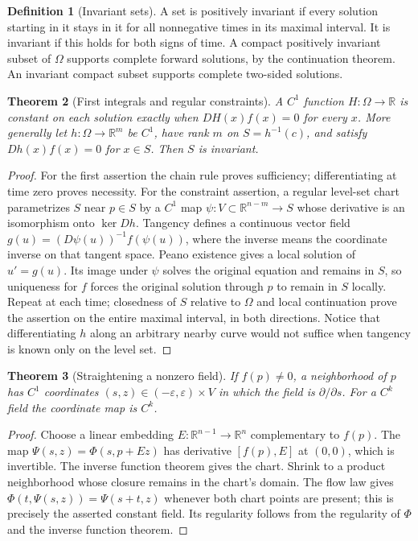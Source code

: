 \documentclass[11pt,oneside]{book}
\newtheorem{theorem}{Theorem}[chapter]
\theoremstyle{definition}
\newtheorem{definition}[theorem]{Definition}
\theoremstyle{remark}\newtheorem{remark}[theorem]{Remark}
\newcommand{\R}{\mathbb R}\newcommand{\C}{\mathbb C}
\begin{document}
\begin{definition}[Invariant sets]\label{d13:11:invariant}
A set is positively invariant if every solution starting in it stays in
it for all nonnegative times in its maximal interval. It is invariant
if this holds for both signs of time. A compact positively invariant
subset of \(\Omega\) supports complete forward solutions, by the
continuation theorem. An invariant compact subset supports complete
two-sided solutions.
\end{definition}

\begin{theorem}[First integrals and regular constraints]\label{d13:11:first-integral}
A \(C^1\) function \(H:\Omega\to\R\) is constant on each solution exactly
when \(DH(x)f(x)=0\) for every \(x\).
More generally let \(h:\Omega\to\R^m\) be \(C^1\), have rank \(m\)
on \(S=h^{-1}(c)\), and satisfy \(Dh(x)f(x)=0\) for \(x\in S\).
Then \(S\) is invariant.
\end{theorem}
\begin{proof}
For the first assertion the chain rule proves sufficiency; differentiating
at time zero proves necessity. For the constraint assertion, a regular
level-set chart parametrizes \(S\) near \(p\in S\) by a \(C^1\) map
\(\psi:V\subset\R^{n-m}\to S\) whose derivative is an isomorphism onto
\(\ker Dh\). Tangency defines a continuous vector field
\(g(u)=(D\psi(u))^{-1}f(\psi(u))\), where the inverse means the
coordinate inverse on that tangent space. Peano existence gives a local
solution of \(u'=g(u)\). Its image under \(\psi\) solves the original
equation and remains in \(S\), so uniqueness for \(f\) forces the original
solution through \(p\) to remain in \(S\) locally. Repeat at each time;
closedness of \(S\) relative to \(\Omega\) and local continuation prove
the assertion on the entire maximal interval, in both directions.
Notice that differentiating \(h\) along an arbitrary nearby curve would
not suffice when tangency is known only on the level set.
\end{proof}

\begin{theorem}[Straightening a nonzero field]\label{d13:11:flowbox}
If \(f(p)\ne0\), a neighborhood of \(p\) has \(C^1\) coordinates
\((s,z)\in(-\varepsilon,\varepsilon)\times V\) in which the field is
\(\partial/\partial s\). For a \(C^k\) field the coordinate map is \(C^k\).
\end{theorem}
\begin{proof}
Choose a linear embedding \(E:\R^{n-1}\to\R^n\) complementary to \(f(p)\).
The map \(\Psi(s,z)=\Phi(s,p+Ez)\) has derivative
\([f(p),E]\) at \((0,0)\), which is invertible.
The inverse function theorem gives the chart. Shrink to a product
neighborhood whose closure remains in the chart's domain.
The flow law gives
\(\Phi(t,\Psi(s,z))=\Psi(s+t,z)\) whenever both chart points are present;
this is precisely the asserted constant field. Its regularity follows
from the regularity of \(\Phi\) and the inverse function theorem.
\end{proof}
\end{document}
